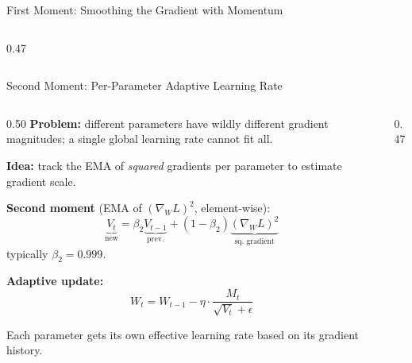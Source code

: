\begin{frame}{First Moment: Smoothing the Gradient with Momentum}
\begin{columns}[T]
\begin{column}{0.47\textwidth}
\begin{center}
      \end{center}
    \end{column}
  \end{columns}
\end{frame}

\begin{frame}{Second Moment: Per-Parameter Adaptive Learning Rate}

  \begin{columns}[T]
    \begin{column}{0.50\textwidth}
      \textbf{Problem:} different parameters have wildly different gradient magnitudes; a single global learning rate cannot fit all.

      \vspace{0.4em}
      \textbf{Idea:} track the EMA of \emph{squared} gradients per parameter to estimate gradient scale.

      \vspace{0.4em}
      \textbf{Second moment} (EMA of $(\nabla_W L)^2$, element-wise):
      \[
        \underbrace{V_t}_{\text{new}} = \beta_2 \underbrace{V_{t-1}}_{\text{prev.}} + (1-\beta_2) \underbrace{(\nabla_W L)^2}_{\text{sq.\ gradient}}
      \]
      typically $\beta_2 = 0.999$.

      \vspace{0.4em}
      \textbf{Adaptive update:}
      \[
        W_t = W_{t-1} - \eta \cdot \frac{M_t}{\sqrt{V_t} + \epsilon}
      \]

      \vspace{0.4em}
      {\small Each parameter gets its own effective learning rate based on its gradient history.}
    \end{column}
    \begin{column}{0.47\textwidth}
      \begin{center}
\end{center}
\end{column}
\end{columns}
\end{frame}
